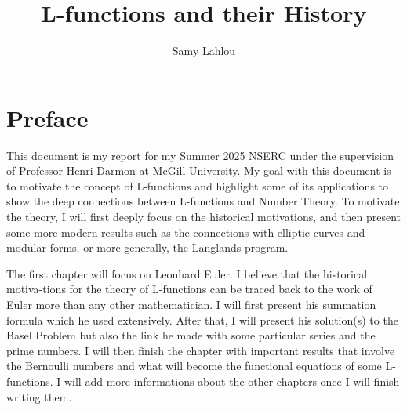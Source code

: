 \documentclass[oneside, 12pt]{book}
\title{\Huge L-functions and their History}
\author{Samy Lahlou}
\date{}
\theoremstyle{plain}
\theoremstyle{definition}
\numberwithin{equation}{section}
\begin{document}
\maketitle 

\frontmatter

\chapter*{Preface}

This document is my report for my Summer 2025 NSERC under the supervision of Professor Henri Darmon at McGill University. My goal with this document is to motivate the concept of L-functions and highlight some of its applications to show the deep connections between L-functions and Number Theory. To motivate the theory, I will first deeply focus on the historical motivations, and then present some more modern results such as the connections with elliptic curves and modular forms, or more generally, the Langlands program.

The first chapter will focus on Leonhard Euler. I believe that the historical motiva-tions for the theory of L-functions can be traced back to the work of Euler more than any other mathematician. I will first present his summation formula which he used extensively. After that, I will present his solution(s) to the Basel Problem but also the link he made with some particular series and the prime numbers. I will then finish the chapter with important results that involve the Bernoulli numbers and what will become the functional equations of some L-functions. I will add more informations about the other chapters once I will finish writing them.
\end{document}
